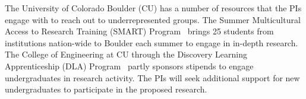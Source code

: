 %
The University of Colorado Boulder (CU) has a number of resources that
the PIs engage with to reach out to underrepresented groups.  The
Summer Multicultural Access to Research Training (SMART)
Program~\cite{SMARTURL} brings 25 students from institutions
nation-wide to Boulder each summer to engage in in-depth research.
The College of Engineering at CU through the Discovery Learning
Apprenticeship (DLA) Program~\cite{DLAURL} partly sponsors stipends to
engage undergraduates in research activity.
%
The PIs will seek additional support for new
undergraduates to participate in the proposed research.





